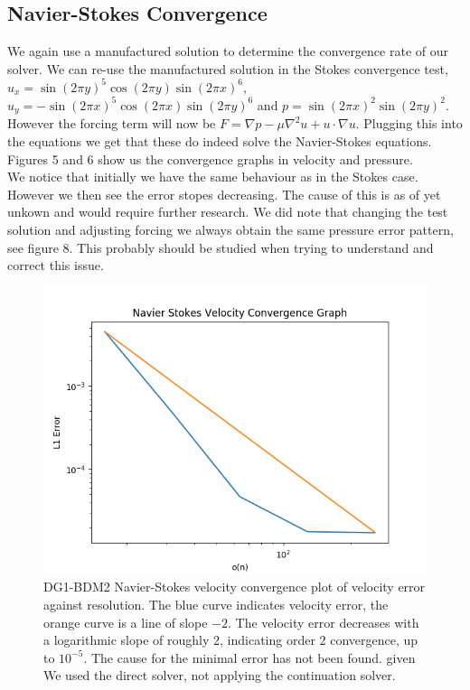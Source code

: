\documentclass[11pt,twoside,a4paper]{article}
\begin{document}
\subsection{Navier-Stokes Convergence}

We again use a manufactured solution to determine the convergence rate of our solver.
We can re-use the manufactured solution in the Stokes convergence test, $u_x = \sin(2 \pi y)^5 \cos(2 \pi y)\sin(2 \pi x)^6$, $u_y= -\sin(2 \pi x)^5 \cos(2 \pi x) \sin(2 \pi y)^6$ and $p = \sin(2 \pi x)^2 \sin(2 \pi y)^2$.\\
However the forcing term will now be $F = \nabla p - \mu \nabla^2 u + u \cdot \nabla u$.
Plugging this into the equations we get that these do indeed solve the Navier-Stokes equations.\\
Figures 5 and 6 show us the convergence graphs in velocity and pressure.\\
We notice that initially we have the same behaviour as in the Stokes case. However we then see the error stopes decreasing. The cause of this is as of yet unkown and would require further research. We did note that changing the test solution and adjusting forcing we always obtain the same pressure error pattern, see figure 8. This probably should be studied when trying to understand and correct this issue.

\begin{figure}
  \includegraphics[width=\linewidth]{navier_stokes_convergence_dbc0.png}
  \caption{DG1-BDM2 Navier-Stokes velocity convergence plot of velocity error against resolution.  The blue curve indicates velocity error, the orange curve is a line of slope $-2$.  The velocity error decreases with a logarithmic slope of roughly 2, indicating order 2 convergence, up to $10^{-5}$. The cause for the minimal error has not been found. given We used the direct solver, not applying the continuation solver.}
\end{figure}
\end{document}
